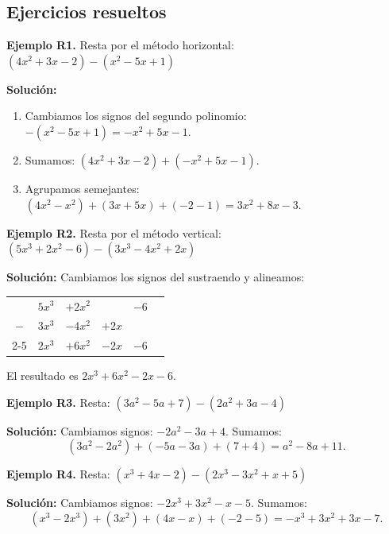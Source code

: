 \documentclass[12pt, letterpaper]{article}
\begin{document}
\subsection{Ejercicios resueltos}

\textbf{Ejemplo R1.} Resta por el método horizontal: $(4x^2 + 3x - 2) - (x^2 - 5x + 1)$

\begin{cuadrosolucion}
  \textbf{Solución:}
  \begin{enumerate}
    \item Cambiamos los signos del segundo polinomio: $-(x^2 - 5x + 1) = -x^2 + 5x - 1$.
    \item Sumamos: $(4x^2 + 3x - 2) + (-x^2 + 5x - 1)$.
    \item Agrupamos semejantes: $(4x^2 - x^2) + (3x + 5x) + (-2 - 1) = 3x^2 + 8x - 3$.
  \end{enumerate}
\end{cuadrosolucion}

\textbf{Ejemplo R2.} Resta por el método vertical: $(5x^3 + 2x^2 - 6) - (3x^3 - 4x^2 + 2x)$

\begin{cuadrosolucion}
  \textbf{Solución:} Cambiamos los signos del sustraendo y alineamos:
  \begin{center}
    \begin{tabular}{cccccc}
          & $5x^3$ & $+2x^2$ &       & $-6$ & \\
      $-$ & $3x^3$ & $-4x^2$ & $+2x$ &      & \\
      \cline{2-5}
          & $2x^3$ & $+6x^2$ & $-2x$ & $-6$ &
    \end{tabular}
  \end{center}
  El resultado es $2x^3 + 6x^2 - 2x - 6$.
\end{cuadrosolucion}

\textbf{Ejemplo R3.} Resta: $(3a^2 - 5a + 7) - (2a^2 + 3a - 4)$

\begin{cuadrosolucion}
  \textbf{Solución:} Cambiamos signos: $-2a^2 - 3a + 4$. Sumamos:
  $$(3a^2 - 2a^2) + (-5a - 3a) + (7 + 4) = a^2 - 8a + 11.$$
\end{cuadrosolucion}

\textbf{Ejemplo R4.} Resta: $(x^3 + 4x - 2) - (2x^3 - 3x^2 + x + 5)$

\begin{cuadrosolucion}
  \textbf{Solución:} Cambiamos signos: $-2x^3 + 3x^2 - x - 5$. Sumamos:
  $$(x^3 - 2x^3) + (3x^2) + (4x - x) + (-2 - 5) = -x^3 + 3x^2 + 3x - 7.$$
\end{cuadrosolucion}
\end{document}

